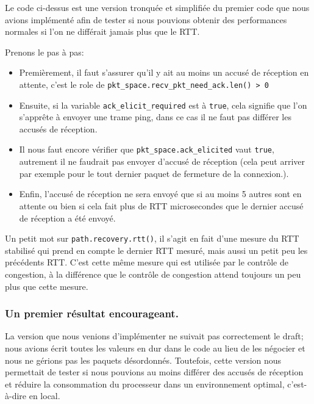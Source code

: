 Le code ci-dessus est une version tronquée et simplifiée du premier code que nous avions implémenté afin de tester si nous pouvions obtenir des performances normales si l'on ne différait jamais plus que le RTT.

\vspace{0.5cm}

Prenons le pas à pas:
\begin{itemize}
    \item Premièrement, il faut s'assurer qu'il y ait au moins un accusé de réception en attente, c'est le role de \verb|pkt_space.recv_pkt_need_ack.len() > 0|
    \item Ensuite, si la variable \verb|ack_elicit_required| est à \verb|true|, cela signifie que l'on s'apprête à envoyer une trame ping, dans ce cas il ne faut pas différer les accusés de réception.
    \item Il nous faut encore vérifier que \verb|pkt_space.ack_elicited| vaut \verb|true|, autrement il ne faudrait pas envoyer d'accusé de réception (cela peut arriver par exemple pour le tout dernier paquet de fermeture de la connexion.).
    \item Enfin, l'accusé de réception ne sera envoyé que si au moins 5 autres sont en attente ou bien si cela fait plus de RTT microsecondes que le dernier accusé de réception a été envoyé.
\end{itemize}

Un petit mot sur \verb|path.recovery.rtt()|, il s'agit en fait d'une mesure du RTT stabilisé qui prend en compte le dernier RTT mesuré, mais aussi un petit peu les précédents RTT. C'est cette même mesure qui est utilisée par le contrôle de congestion, à la différence que le contrôle de congestion attend toujours un peu plus que cette mesure.

\subsubsection{Un premier résultat encourageant.}

La version que nous venions d'implémenter ne suivait pas correctement le draft; nous avions écrit toutes les valeurs en dur dans le code au lieu de les négocier et nous ne gérions pas les paquets désordonnés. Toutefois, cette version nous permettait de tester si nous pouvions au moins différer des accusés de réception et réduire la consommation du processeur dans un environnement optimal, c'est-à-dire en local.

\vspace{0.5cm}

